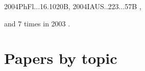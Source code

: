 \documentclass[12pt]{article}
\begin{document}
\begin{description}
{2004PhFl...16.1020B,%
2004IAUS..223...57B%
},\item
and 7 times in 2003 \citep{
2003A&A...411..321Y,%
2003A&A...407....7Y,%
2003AGUFMGP11C0280M,%
2003ApJ...597L.141H,%
2003eclm.book..269B,%
2003astro.ph..3371B,%
2003PhRvE..68b6304D%
}.
\end{description}

\section{Papers by topic}
\end{document}
